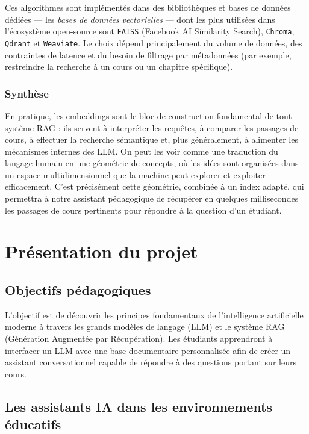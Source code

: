 \documentclass[a4paper,11pt]{article}
\begin{document}
Ces algorithmes sont implémentés dans des bibliothèques et bases de données
dédiées --- les \emph{bases de données vectorielles} --- dont les plus
utilisées dans l'écosystème open-source sont \texttt{FAISS} (Facebook AI
Similarity Search), \texttt{Chroma}, \texttt{Qdrant} et \texttt{Weaviate}.
Le choix dépend principalement du volume de données, des contraintes de
latence et du besoin de filtrage par métadonnées (par exemple, restreindre
la recherche à un cours ou un chapitre spécifique).

\subsubsection{Synthèse}

En pratique, les embeddings sont le bloc de construction fondamental de tout
système RAG : ils servent à interpréter les requêtes, à comparer les passages
de cours, à effectuer la recherche sémantique et, plus généralement, à
alimenter les mécanismes internes des LLM. On peut les voir comme une
\og traduction \fg{} du langage humain en une géométrie de concepts, où
les idées sont organisées dans un espace multidimensionnel que la machine
peut explorer et exploiter efficacement. C'est précisément cette géométrie,
combinée à un index adapté, qui permettra à notre assistant pédagogique de
récupérer en quelques millisecondes les passages de cours pertinents pour
répondre à la question d'un étudiant.

\newpage
\section{Présentation du projet}

\subsection{Objectifs pédagogiques}

L'objectif est de découvrir les principes fondamentaux de l'intelligence
artificielle moderne à travers les grands modèles de langage (LLM) et le
système RAG (Génération Augmentée par Récupération). Les étudiants
apprendront à interfacer un LLM avec une base documentaire personnalisée
afin de créer un assistant conversationnel capable de répondre à des
questions portant sur leurs cours.

\subsection{Les assistants IA dans les environnements éducatifs}
\end{document}
